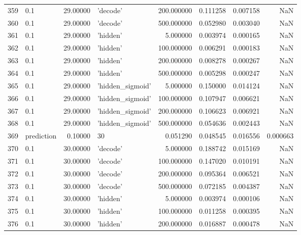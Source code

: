 \documentclass[10pt,a4paper]{article}
\begin{document}
\begin{tabular}{llrlrrrr}
359  &         0.1 &  29.00000 &           'decode' &  200.000000 &  0.111258 &  0.007158 &       NaN \\
360  &         0.1 &  29.00000 &           'decode' &  500.000000 &  0.052980 &  0.003040 &       NaN \\
361  &         0.1 &  29.00000 &           'hidden' &    5.000000 &  0.003974 &  0.000165 &       NaN \\
362  &         0.1 &  29.00000 &           'hidden' &  100.000000 &  0.006291 &  0.000183 &       NaN \\
363  &         0.1 &  29.00000 &           'hidden' &  200.000000 &  0.008278 &  0.000267 &       NaN \\
364  &         0.1 &  29.00000 &           'hidden' &  500.000000 &  0.005298 &  0.000247 &       NaN \\
365  &         0.1 &  29.00000 &   'hidden\_sigmoid' &    5.000000 &  0.150000 &  0.014124 &       NaN \\
366  &         0.1 &  29.00000 &   'hidden\_sigmoid' &  100.000000 &  0.107947 &  0.006621 &       NaN \\
367  &         0.1 &  29.00000 &   'hidden\_sigmoid' &  200.000000 &  0.106623 &  0.006921 &       NaN \\
368  &         0.1 &  29.00000 &   'hidden\_sigmoid' &  500.000000 &  0.054636 &  0.002443 &       NaN \\
369  &  prediction &   0.10000 &                 30 &    0.051290 &  0.048545 &  0.016556 &  0.000663 \\
370  &         0.1 &  30.00000 &           'decode' &    5.000000 &  0.188742 &  0.015169 &       NaN \\
371  &         0.1 &  30.00000 &           'decode' &  100.000000 &  0.147020 &  0.010191 &       NaN \\
372  &         0.1 &  30.00000 &           'decode' &  200.000000 &  0.095364 &  0.006521 &       NaN \\
373  &         0.1 &  30.00000 &           'decode' &  500.000000 &  0.072185 &  0.004387 &       NaN \\
374  &         0.1 &  30.00000 &           'hidden' &    5.000000 &  0.003974 &  0.000106 &       NaN \\
375  &         0.1 &  30.00000 &           'hidden' &  100.000000 &  0.011258 &  0.000395 &       NaN \\
376  &         0.1 &  30.00000 &           'hidden' &  200.000000 &  0.016887 &  0.000478 &       NaN \\

\end{tabular}
\end{document}
